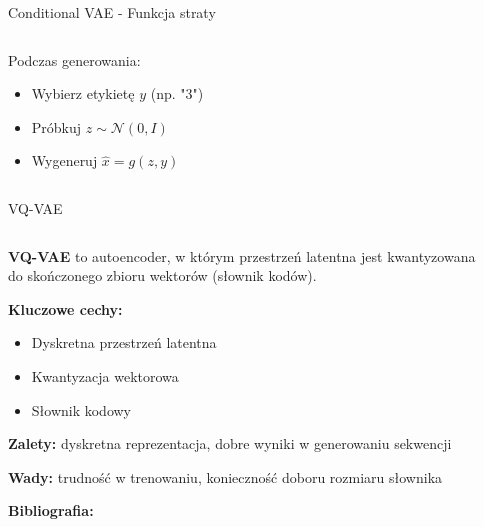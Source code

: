 \documentclass{beamer}
\begin{document}
\begin{frame}{Conditional VAE - Funkcja straty}
\begin{columns}
\begin{column}{0.5\textwidth}
      \medskip
      Podczas generowania:
      \begin{itemize}
        \item Wybierz etykietę $y$ (np. "3")
        \item Próbkuj $z \sim \mathcal{N}(0, I)$
        \item Wygeneruj $\hat{x} = g(z, y)$
      \end{itemize}
    \end{column}
  \end{columns}
\end{frame}

\begin{frame}{VQ-VAE}
  \begin{columns}
    \begin{column}{0.6\textwidth}
      \textbf{VQ-VAE} to autoencoder, w którym przestrzeń latentna jest kwantyzowana do skończonego zbioru wektorów (słownik kodów).
      
      \medskip
      \textbf{Kluczowe cechy:}
      \begin{itemize}
        \item Dyskretna przestrzeń latentna
        \item Kwantyzacja wektorowa
        \item Słownik kodowy
      \end{itemize}
      
      \textbf{Zalety:} dyskretna reprezentacja, dobre wyniki w generowaniu sekwencji
      
      \textbf{Wady:} trudność w trenowaniu, konieczność doboru rozmiaru słownika
      
      \textbf{Bibliografia:} \cite{van2017neural}
    \end{column}
    \begin{column}{0.4\textwidth}
    \end{column}
  \end{columns}
\end{frame}
\end{document}
